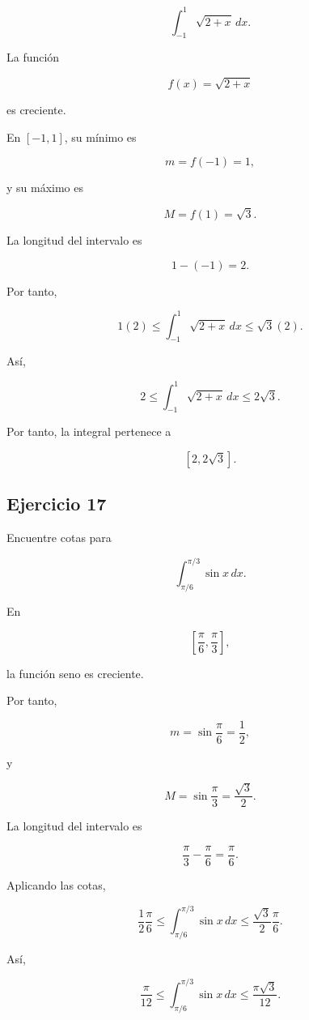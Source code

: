 \documentclass[12pt]{article}
\begin{document}
\[
\int_{-1}^{1}\sqrt{2+x}\,dx.
\]

La función

\[
f(x)=\sqrt{2+x}
\]

es creciente.

En \([-1,1]\), su mínimo es

\[
m=f(-1)=1,
\]

y su máximo es

\[
M=f(1)=\sqrt3.
\]

La longitud del intervalo es

\[
1-(-1)=2.
\]

Por tanto,

\[
1(2)
\leq
\int_{-1}^{1}\sqrt{2+x}\,dx
\leq
\sqrt3(2).
\]

Así,

\[
\boxed{
2
\leq
\int_{-1}^{1}\sqrt{2+x}\,dx
\leq
2\sqrt3
}.
\]

Por tanto, la integral pertenece a

\[
\boxed{
[2,2\sqrt3]
}.
\]

\subsection*{Ejercicio 17}

Encuentre cotas para

\[
\int_{\pi/6}^{\pi/3}\sin x\,dx.
\]

En

\[
\left[\frac{\pi}{6},\frac{\pi}{3}\right],
\]

la función seno es creciente.

Por tanto,

\[
m
=
\sin\frac{\pi}{6}
=
\frac12,
\]

y

\[
M
=
\sin\frac{\pi}{3}
=
\frac{\sqrt3}{2}.
\]

La longitud del intervalo es

\[
\frac{\pi}{3}-\frac{\pi}{6}
=
\frac{\pi}{6}.
\]

Aplicando las cotas,

\[
\frac12\frac{\pi}{6}
\leq
\int_{\pi/6}^{\pi/3}\sin x\,dx
\leq
\frac{\sqrt3}{2}\frac{\pi}{6}.
\]

Así,

\[
\boxed{
\frac{\pi}{12}
\leq
\int_{\pi/6}^{\pi/3}\sin x\,dx
\leq
\frac{\pi\sqrt3}{12}
}.
\]

\end{document}
